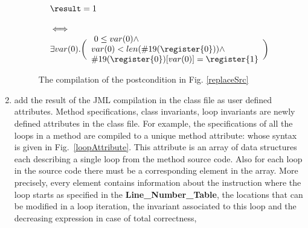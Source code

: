 \begin{enumerate}
\begin{figure}[t]
 $$\begin{array}{l}
         \result = 1 \\
          \\ 
         \iff \\ 
         \exists  var(0) .
           \biggl(\begin{array}{l} \ 0 \leq var(0) \wedge\\ 
             var(0) < len(\#19(\register{0})) \wedge \\
             \#19(\register{0})[var(0)] = \register{1} 
         \end{array} \biggr) 
   \end{array}
$$
\caption{\sc The compilation of the postcondition in Fig. \ref{replaceSrc}}
\label{postCompile}
\end{figure}





\item add the result of the JML compilation in the class file as user defined attributes. Method specifications, class invariants, loop invariants are 
newly defined attributes in the class file.
 For example, the specifications of all the loops in a method are compiled to a unique method attribute: whose syntax is given in Fig.~\ref{loopAttribute}. This attribute is an array of data structures each describing a single loop from the method source code. Also for each loop in the source code there must be a corresponding element in the array. 
More precisely, every element contains information about the instruction where the loop starts as specified in the
\textbf{Line\_Number\_Table}, the locations that can be modified in a loop iteration, 
 the invariant associated to this loop and the decreasing expression in case of total correctness, 
\end{enumerate}

